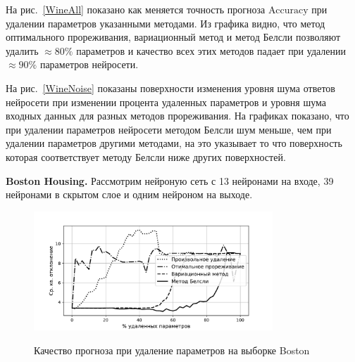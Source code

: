 На рис.~\ref{WineAll} показано как меняется точность прогноза $\text{Accuracy}$ при удалении параметров указанными методами. Из графика видно, что метод оптимального прореживания, вариационный метод и метод Белсли позволяют удалить $\approx80\%$ параметров и качество всех этих методов падает при удалении $\approx90\%$ параметров нейросети. 

На рис.~\ref{WineNoise} показаны поверхности изменения уровня шума ответов нейросети при изменении процента удаленных параметров и уровня шума входных данных для разных методов прореживания. На графиках показано, что при удалении параметров нейросети методом Белсли шум меньше, чем при удалении параметров другими методами, на это указывает то что поверхность которая соответствует методу Белсли ниже других поверхностей.

\textbf{Boston Housing.} Рассмотрим нейроную сеть с 13 нейронами на входе, 39 нейронами в скрытом слое и одним нейроном на выходе.

\begin{figure}[h!t]\center
\includegraphics[width=0.8\textwidth]{plots/grabovoy/Boston/All.pdf}\\
\caption{Качество прогноза при удаление параметров на выборке Boston}
\label{BostonAll}
\end{figure}


